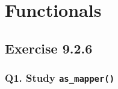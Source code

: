 \documentclass[
]{book}
\begin{document}
\hypertarget{functionals}{%
\chapter{Functionals}\label{functionals}}

\hypertarget{exercise-9.2.6}{%
\section{Exercise 9.2.6}\label{exercise-9.2.6}}

\hypertarget{q1.-study-as_mapper}{%
\subsection*{\texorpdfstring{Q1. Study \texttt{as\_mapper()}}{Q1. Study as\_mapper()}}\label{q1.-study-as_mapper}}
\end{document}
